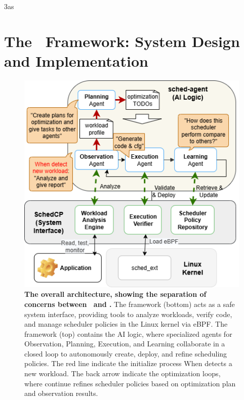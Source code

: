 3as\section{The \sys\ Framework: System Design and Implementation}
\label{sec:schedcp_framework}

\begin{figure}
    \centering
    \includegraphics[width=0.9\columnwidth]{sections/img/arch-scheddcp.png}
    \caption{
        \textbf{The overall architecture, showing the separation of concerns between \sys\ and \agent.} 
        The \textbf{\sys} framework (bottom) acts as a safe system interface, providing tools to analyze workloads, verify code, and manage scheduler policies in the Linux kernel via eBPF.
        The \textbf{\agent} framework (top) contains the AI logic, where specialized agents for Observation, Planning, Execution, and Learning collaborate in a closed loop to autonomously create, deploy, and refine scheduling policies. The red line indicate the initialize process When \sys detects a new workload. The back arrow indicate the optimization loops, where \agent continue refines scheduler policies based on optimization plan and observation results.
    }
    \label{fig:frameworkarch}
\end{figure}

